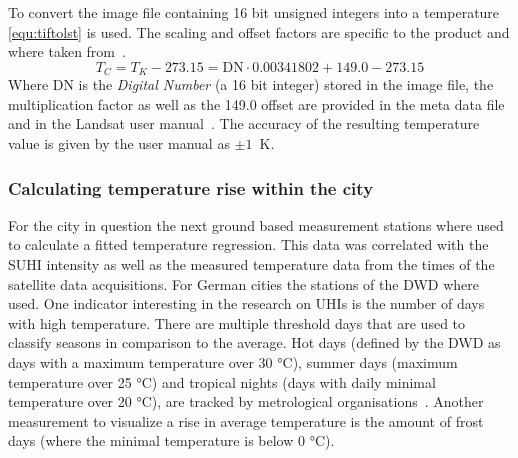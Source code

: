 \documentclass[12pt,a4paper, english,twoside]{scrartcl}
\begin{document}
      To convert the image file containing 16 bit unsigned integers into a temperature \cref{equ:tiftolst} is used. The scaling and offset factors are specific to the product and where taken from~\cite[Table 6-1]{EROASC2013}.
      \begin{equation}\label{equ:tiftolst}
        T_C = T_K - 273.15 = \text{DN} \cdot 0.00341802 + 149.0 - 273.15 
      \end{equation}
      Where DN is the \textit{Digital Number} (a 16 bit integer) stored in the image file, the multiplication factor as well as the 149.0 offset are provided in the meta data file and in the Landsat user manual~\autocite{EROASC2013}. 
      The accuracy of the resulting temperature value is given by the user manual as $\pm 1$~K.
      \newpage
    \subsubsection{Calculating temperature rise within the city}
      For the city in question the next ground based measurement stations where used to calculate a fitted temperature regression. 
      This data was correlated with the \gls{SUHI} intensity as well as the measured temperature data from the times of the satellite data acquisitions. 
      For German cities the stations of the \gls{DWD} where used.
      One indicator interesting in the research on \glspl{UHI} is the number of days with high temperature.
      There are multiple threshold days that are used to classify seasons in comparison to the average.
      Hot days (defined by the \gls{DWD} as days with a maximum temperature over 30 °C), summer days (maximum temperature over 25 °C) and tropical nights (days with daily minimal temperature over 20 °C), are tracked by metrological organisations~\autocite{dwdklimalexikon}.
      Another measurement to visualize a rise in average temperature is the amount of frost days (where the minimal temperature is below 0 °C). 
\end{document}
